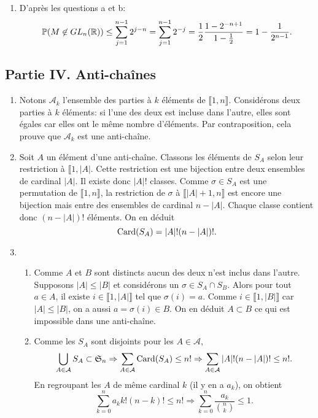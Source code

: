 \begin{enumerate}
\begin{enumerate}
            \item D'après les questions a et b:
            \[ \mathbb{P}(M\not \in GL_{n}(\mathbb{R})) \leq \sum_{j=1}^{n-1}2^{j-n} = \sum_{j=1}^{n-1}2^{-j} = \frac{1}{2}\frac{1 - 2^{-n+1}}{1 - \frac{1}{2}} = 1 -\frac{1}{2^{n-1}}.\]
           \end{enumerate}

\end{enumerate}


                                                
\subsection*{Partie IV. Anti-chaînes}
\begin{enumerate}
 \item Notons $\mathcal{A}_k$ l'ensemble des parties à $k$ éléments de $\llbracket 1,n \rrbracket$. Considérons deux parties à $k$ éléments: si l'une des deux est incluse dans l'autre, elles sont égales car elles ont le même nombre d'éléments. Par contraposition, cela prouve que $\mathcal{A}_k$ est une anti-chaîne. 
 \item Soit $A$ un élément d'une anti-chaîne. Classons les éléments de $S_A$ selon leur restriction à $\llbracket 1,|A|$. Cette restriction est une bijection entre deux ensembles de cardinal $|A|$. Il existe donc $|A|!$ classes. Comme $\sigma \in S_A$ est une permutation de $\llbracket 1,n \rrbracket$, la restriction de $\sigma$ à $\llbracket |A|+1, n\rrbracket$ est encore une bijection mais entre des ensembles de cardinal $n-|A|$. Chaque classe contient donc $(n-|A|)!$ éléments. On en déduit
 \[
  \operatorname{Card}(S_A) = |A|! (n-|A|)!.
 \]

 \item
 \begin{enumerate}
  \item Comme $A$ et $B$ sont distincts aucun des deux n'est inclus dans l'autre. Supposons $|A| \leq |B|$ et considérons un $\sigma \in S_A \cap S_B$. Alors pour tout $a\in A$, il existe $i\in \llbracket 1, |A|\rrbracket$ tel que $\sigma(i) = a$. Comme $i\in \llbracket 1 ,|B|\rrbracket$ car $|A| \leq |B|$, on a aussi $a = \sigma(i) \in B$. On en déduit $A\subset B$ ce qui est impossible dans une anti-chaîne.
  \item Comme les $S_A$ sont disjoints pour les $A\in \mathcal{A}$,
  \[
   \bigcup_{A \in \mathcal{A}}S_A \subset \mathfrak{S}_n \Rightarrow \sum_{A \in \mathcal{A} } \operatorname{Card}(S_A) \leq n!
   \Rightarrow 
   \sum_{A \in \mathcal{A} }|A|! (n-|A|)! \leq n!.
  \]
En regroupant les $A$ de même cardinal $k$ (il y en a $a_k$), on obtient
\[
 \sum_{k=0}^n a_k k!(n-k)! \leq n! \Rightarrow \sum_{k=0}^n \frac{a_k}{\binom{n}{k}} \leq 1.
\]


\end{enumerate}
\end{enumerate}

